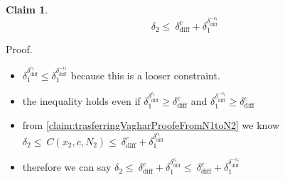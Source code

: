 \documentclass[11pt]{article}
\newtheorem{claim}{Claim}
\begin{document}
 \begin{claim}\label{claim:EasierToSolveConstraint}
 $$ \delta_2 \leq\ \delta^c_\text{diff}+\delta_1^{\delta^{-c_t}_{\text{diff}}} $$
 \end{claim}
 Proof. \begin{itemize}
 \item $\delta_1^{\delta^{c_t}_{\text{diff}}} \leq  \delta_1^{\delta^{-c_t}_{\text{diff}}}$ because this is a looser constraint.
 \item the inequality holds even if $\delta_1^{\delta^{c_t}_{\text{diff}}}\geq{\delta^c_{\text{diff}}}$ and $\delta_1^{\delta^{-c_t}_{\text{diff}}}\geq{\delta^c_{\text{diff}}}$
 \item from \ref{claim:trasferringVagharProofeFromN1toN2} we know $ \delta_2 \leq\ C(x_2,c,N_2) \leq\ \delta^c_\text{diff}+\delta_1^{\delta^{c_t}_{\text{diff}}} $
 \item therefore we can say $ \delta_2 \leq\ \delta^c_\text{diff}+\delta_1^{\delta^{c_t}_{\text{diff}}}\leq\ \delta^c_\text{diff}+\delta_1^{\delta^{-c_t}_{\text{diff}}} $
  \end{itemize}
 
\end{document}
